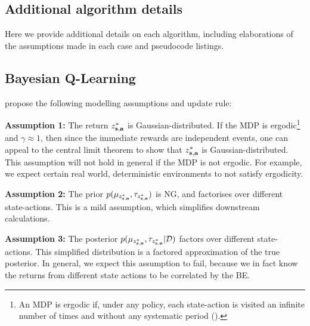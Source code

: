 \documentclass{article}
\begin{document}
\clearpage
\begin{appendices}
\section{Additional algorithm details}

Here we provide additional details on each algorithm, including elaborations of the assumptions made in each case and pseudocode listings.

\subsection{Bayesian Q-Learning} \label{app:bql}

\cite{bqlearning} propose the following modelling assumptions and update rule:

\textbf{Assumption 1:} The return $z^*_{\mathbf{s}, \mathbf{a}}$ is Gaussian-distributed. If the MDP is ergodic\footnote{An MDP is ergodic if, under any policy, each state-action is visited an infinite number of times and without any systematic period (\cite{silver}).} and $\gamma \approx 1$, then since the immediate rewards are independent events, one can appeal to the central limit theorem to show that $z^*_{\mathbf{s}, \mathbf{a}}$ is Gaussian-distributed. This assumption will not hold in general if the MDP is not ergodic. For example, we expect certain real world, deterministic environments to not satisfy ergodicity.

\textbf{Assumption 2:} The prior $p(\mu_{z^*_{\mathbf{s}, \mathbf{a}}}, \tau_{z^*_{\mathbf{s}, \mathbf{a}}})$ is NG, and factorises over different state-actions. This is a mild assumption, which simplifies downstream calculations.

\textbf{Assumption 3:} The posterior $p(\mu_{z^*_{\mathbf{s}, \mathbf{a}}}, \tau_{z^*_{\mathbf{s}, \mathbf{a}}}| \mathcal{D})$ factors over different state-actions. This simplified distribution is a factored approximation of the true posterior. In general, we expect this assumption to fail, because we in fact know the returns from different state actions to be correlated by the BE.


\end{appendices}
\end{document}
